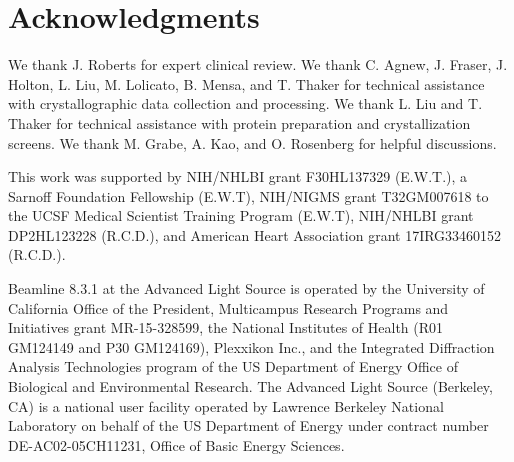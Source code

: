 \section{Acknowledgments}
We thank J. Roberts for expert clinical review. We thank C. Agnew, J. Fraser, J. Holton, L. Liu, M. Lolicato, B. Mensa, and T. Thaker for technical assistance with crystallographic data collection and processing. We thank L. Liu and T. Thaker for technical assistance with protein preparation and crystallization screens. We thank M. Grabe, A. Kao, and O. Rosenberg for helpful discussions. 

This work was supported by NIH/NHLBI grant F30HL137329 (E.W.T.), a Sarnoff Foundation Fellowship (E.W.T), NIH/NIGMS grant T32GM007618 to the UCSF Medical Scientist Training Program (E.W.T), NIH/NHLBI grant DP2HL123228 (R.C.D.), and American Heart Association grant 17IRG33460152 (R.C.D.).

Beamline 8.3.1 at the Advanced Light Source is operated by the University of California Office of the President, Multicampus Research Programs and Initiatives grant MR-15-328599, the National Institutes of Health (R01 GM124149 and P30 GM124169), Plexxikon Inc., and the Integrated Diffraction Analysis Technologies program of the US Department of Energy Office of Biological and Environmental Research. The Advanced Light Source (Berkeley, CA) is a national user facility operated by Lawrence Berkeley National Laboratory on behalf of the US Department of Energy under contract number DE-AC02-05CH11231, Office of Basic Energy Sciences.